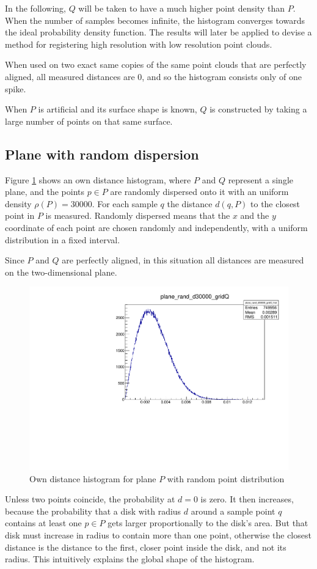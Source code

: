 In the following, $Q$ will be taken to have a much higher point density than $P$. When the number of samples becomes infinite, the histogram converges towards the ideal probability density function. The results will later be applied to devise a method for registering high resolution with low resolution point clouds.

When used on two exact same copies of the same point clouds that are perfectly aligned, all measured distances are $0$, and so the histogram consists only of one spike.

When $P$ is artificial and its surface shape is known, $Q$ is constructed by taking a large number of points on that same surface.

\subsection{Plane with random dispersion}
Figure \ref{fig:plane_rand_d30000} shows an own distance histogram, where $P$ and $Q$ represent a single plane, and the points $p \in P$ are randomly dispersed onto it with an uniform density $\rho(P) = 30000$. For each sample $q$ the distance $d(q, P)$ to the closest point in $P$ is measured. Randomly dispersed means that the $x$ and the $y$ coordinate of each point are chosen randomly and independently, with a uniform distribution in a fixed interval.

Since $P$ and $Q$ are perfectly aligned, in this situation all distances are measured on the two-dimensional plane.

\begin{figure}[H]
\centering
\includegraphics[width=.6\textwidth]{fig/plane_rand_d30000_gridQ.pdf}
\caption{Own distance histogram for plane $P$ with random point distribution}
\label{fig:plane_rand_d30000}
\end{figure}

Unless two points coincide, the probability at $d = 0$ is zero. It then increases, because the probability that a disk with radius $d$ around a sample point $q$ contains at least one $p \in P$ gets larger proportionally to the disk's area. But that disk must increase in radius to contain more than one point, otherwise the closest distance is the distance to the first, closer point inside the disk, and not its radius. This intuitively explains the global shape of the histogram.

